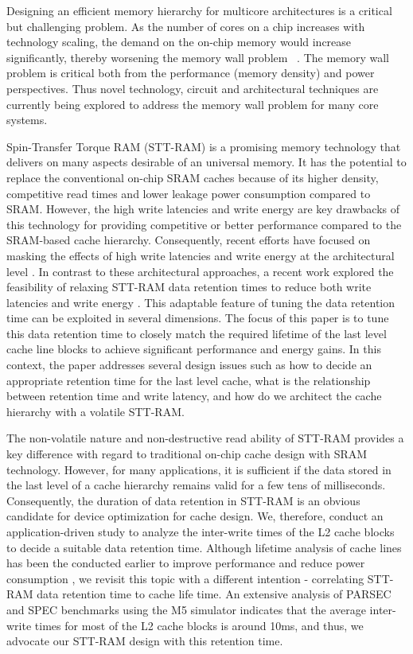 
Designing an efficient memory hierarchy for multicore architectures is a critical but challenging
problem. As the number of cores on a chip increases with technology scaling, the demand on the
on-chip memory would increase significantly, thereby worsening the memory wall problem
~\cite{BurgerGK96}. The memory wall problem is critical both from the performance (memory density)
and power perspectives. Thus novel technology, circuit and architectural techniques are currently
being explored to address the memory wall problem for many core systems.

Spin-Transfer Torque RAM (STT-RAM) is a promising memory technology that delivers on many aspects
desirable of an universal memory. It has the potential to replace the conventional on-chip SRAM
caches because of its higher density, competitive read times and lower leakage power consumption
compared to SRAM. However, the high write latencies and write energy are key drawbacks of this
technology for providing competitive or better performance compared to the SRAM-based cache
hierarchy. Consequently, recent efforts have focused on masking the effects of high write latencies
and write energy at the architectural level \cite{}. In contrast to these architectural approaches, a
recent  work explored the feasibility of relaxing STT-RAM data retention times to reduce both write
latencies and write energy \cite{}. This adaptable feature of tuning the data retention time can be
exploited in several dimensions. The focus of this paper is  to tune this data retention time to
closely match the required lifetime of the last level cache line blocks to achieve significant
performance and energy gains. In this context, the paper addresses several design issues such as how
to decide an appropriate retention time for the last level cache, what is the relationship between
retention time and write latency, and how do we architect the cache hierarchy with a volatile
STT-RAM.

The non-volatile nature and non-destructive read ability of  STT-RAM provides a key difference with
regard to traditional on-chip cache design with SRAM technology. However, for many applications, it
is sufficient if the data stored in the last level of a cache hierarchy remains valid for a few tens
of milliseconds. Consequently, the duration of data retention in STT-RAM is an obvious candidate for
device optimization for cache design. We, therefore, conduct an application-driven study to analyze
the inter-write times of the L2 cache blocks to decide a suitable data retention time. Although
lifetime analysis of cache lines has been the conducted earlier to improve performance and reduce
power consumption \cite{}, we revisit this topic with a different intention - correlating STT-RAM
data retention time to cache life time. An extensive analysis of PARSEC and SPEC benchmarks using the
M5 simulator \cite{} indicates that the average inter-write times for most of the L2 cache blocks is
around 10ms, and thus, we advocate our STT-RAM design with this retention time.

